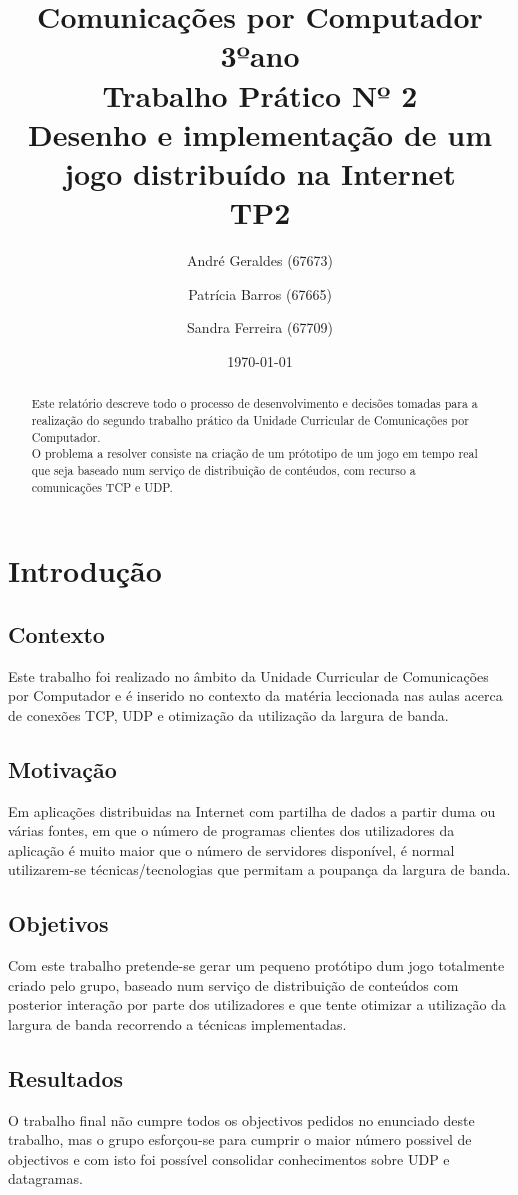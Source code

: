 \documentclass{report}
\title{Comunicações por Computador\\3ºano\\ Trabalho Prático Nº 2\\\textbf{Desenho e implementação de um jogo distribuído na Internet}\\TP2}
\author{André Geraldes (67673) \and Patrícia Barros (67665) \and Sandra Ferreira (67709)}
\date{\today}
\begin{document}
\maketitle

\begin{abstract}
Este relatório descreve todo o processo de desenvolvimento e decisões tomadas para a realização do segundo trabalho prático da Unidade Curricular de Comunicações por Computador.\\ O problema a resolver consiste na criação de um prótotipo de um jogo em tempo real que seja baseado num serviço de distribuição de contéudos, com recurso a comunicações TCP e UDP.
 
\end{abstract}

\tableofcontents

\chapter{Introdução} \label{intro}


\section*{Contexto}
Este trabalho foi realizado no âmbito da Unidade Curricular de Comunicações por Computador e é inserido no contexto da matéria leccionada nas aulas acerca de conexões TCP, UDP e otimização da utilização da largura de banda.
\section*{Motivação}
Em aplicações distribuidas na Internet com partilha de dados a partir duma ou várias fontes, em que o número de programas clientes dos utilizadores da aplicação é muito maior que o número de servidores disponível, é normal utilizarem-se técnicas/tecnologias que permitam a poupança da largura de banda. 
\section*{Objetivos}
Com este trabalho pretende-se gerar um pequeno protótipo dum jogo totalmente criado pelo grupo, baseado num serviço de distribuição de conteúdos com posterior interação por parte dos utilizadores e que tente otimizar a utilização da largura de banda recorrendo a técnicas implementadas.
\section*{Resultados}
O trabalho final não cumpre todos os objectivos pedidos no enunciado deste trabalho, mas o grupo esforçou-se para cumprir o maior número possivel de objectivos e com isto foi possível consolidar conhecimentos sobre UDP e datagramas.
\end{document}
